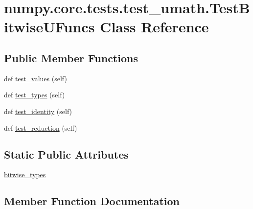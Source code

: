 \hypertarget{classnumpy_1_1core_1_1tests_1_1test__umath_1_1TestBitwiseUFuncs}{}\section{numpy.\+core.\+tests.\+test\+\_\+umath.\+Test\+Bitwise\+U\+Funcs Class Reference}
\label{classnumpy_1_1core_1_1tests_1_1test__umath_1_1TestBitwiseUFuncs}
\subsection*{Public Member Functions}
\begin{DoxyCompactItemize}
\item 
def \hyperlink{classnumpy_1_1core_1_1tests_1_1test__umath_1_1TestBitwiseUFuncs_a15f8801a0813747ba1b89f84a5851fa4}{test\+\_\+values} (self)
\item 
def \hyperlink{classnumpy_1_1core_1_1tests_1_1test__umath_1_1TestBitwiseUFuncs_a523d3acc4b116d3cb67020ac077cfb50}{test\+\_\+types} (self)
\item 
def \hyperlink{classnumpy_1_1core_1_1tests_1_1test__umath_1_1TestBitwiseUFuncs_a4909d531c8f7affff7e46dc6e2cf12a0}{test\+\_\+identity} (self)
\item 
def \hyperlink{classnumpy_1_1core_1_1tests_1_1test__umath_1_1TestBitwiseUFuncs_ae6882d1615098822fea4c26565fba736}{test\+\_\+reduction} (self)
\end{DoxyCompactItemize}
\subsection*{Static Public Attributes}
\begin{DoxyCompactItemize}
\item 
\hyperlink{classnumpy_1_1core_1_1tests_1_1test__umath_1_1TestBitwiseUFuncs_a50acbde9df1941076333ea5878ff605b}{bitwise\+\_\+types}
\end{DoxyCompactItemize}


\subsection{Member Function Documentation}
\mbox{\label{classnumpy_1_1core_1_1tests_1_1test__umath_1_1TestBitwiseUFuncs_a4909d531c8f7affff7e46dc6e2cf12a0}} 
